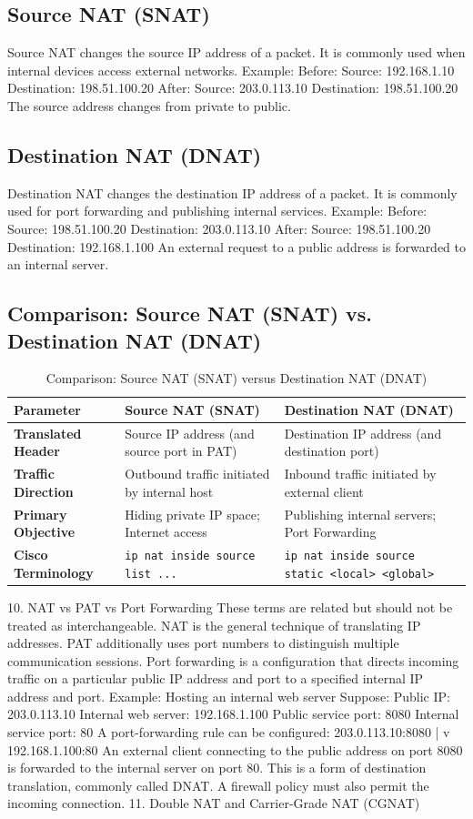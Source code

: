 \subsection{Source NAT (SNAT)}
Source NAT changes the source IP address of a packet.
It is commonly used when internal devices access external networks.
Example:
Before: Source: 192.168.1.10 Destination: 198.51.100.20 After: Source: 203.0.113.10 Destination: 198.51.100.20
The source address changes from private to public.
\subsection{Destination NAT (DNAT)}
Destination NAT changes the destination IP address of a packet.
It is commonly used for port forwarding and publishing internal services.
Example:
Before: Source: 198.51.100.20 Destination: 203.0.113.10 After: Source: 198.51.100.20 Destination: 192.168.1.100
An external request to a public address is forwarded to an internal server.
\subsection{Comparison: Source NAT (SNAT) vs. Destination NAT (DNAT)}
\begin{table}[htbp]
\centering
\caption{Comparison: Source NAT (SNAT) versus Destination NAT (DNAT)}
\label{tab:snat_vs_dnat}
\begin{tabularx}{\textwidth}{p{3.8cm} X X}
\toprule
\textbf{Parameter} & \textbf{Source NAT (SNAT)} & \textbf{Destination NAT (DNAT)} \\
\midrule
\textbf{Translated Header} & Source IP address (and source port in PAT) & Destination IP address (and destination port) \\
\textbf{Traffic Direction} & Outbound traffic initiated by internal host & Inbound traffic initiated by external client \\
\textbf{Primary Objective} & Hiding private IP space; Internet access & Publishing internal servers; Port Forwarding \\
\textbf{Cisco Terminology} & \texttt{ip nat inside source list ...} & \texttt{ip nat inside source static <local> <global>} \\
\bottomrule
\end{tabularx}
\end{table}
10. NAT vs PAT vs Port Forwarding
These terms are related but should not be treated as interchangeable.
NAT is the general technique of translating IP addresses.
PAT additionally uses port numbers to distinguish multiple communication sessions.
Port forwarding is a configuration that directs incoming traffic on a particular public IP address and port to a specified internal IP address and port.
Example: Hosting an internal web server
Suppose:
Public IP: 203.0.113.10
Internal web server: 192.168.1.100
Public service port: 8080
Internal service port: 80
A port-forwarding rule can be configured:
203.0.113.10:8080 | v 192.168.1.100:80
An external client connecting to the public address on port 8080 is forwarded to the internal server on port 80.
This is a form of destination translation, commonly called DNAT.
A firewall policy must also permit the incoming connection.
11. Double NAT and Carrier-Grade NAT (CGNAT)
